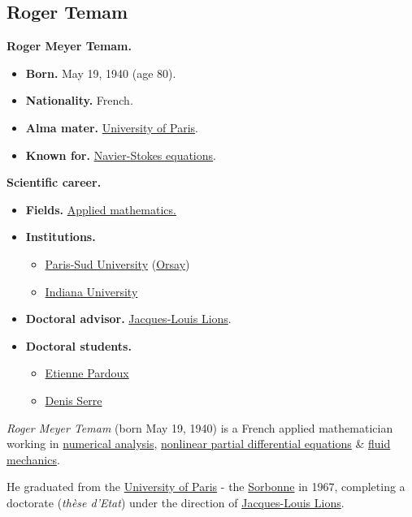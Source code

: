 \documentclass{article}
\begin{document}
\subsection{Roger Temam}
\textbf{Roger Meyer Temam.}
\begin{itemize}
	\item \textbf{Born.} May 19, 1940 (age 80).
	\item \textbf{Nationality.} French.
	\item \textbf{Alma mater.} \href{https://en.wikipedia.org/wiki/University_of_Paris}{University of Paris}.
	\item \textbf{Known for.} \href{https://en.wikipedia.org/wiki/Navier-Stokes_equations}{Navier-Stokes equations}.
\end{itemize}
\textbf{Scientific career.}
\begin{itemize}
	\item \textbf{Fields.} \href{https://en.wikipedia.org/wiki/Applied_mathematics}{Applied mathematics.}
	\item \textbf{Institutions.}
	\begin{itemize}
		\item \href{https://en.wikipedia.org/wiki/Paris-Sud_University}{Paris-Sud University} (\href{https://en.wikipedia.org/wiki/Orsay}{Orsay})
		\item \href{https://en.wikipedia.org/wiki/Indiana_University_Bloomington}{Indiana University}
	\end{itemize}
	\item \textbf{Doctoral advisor.} \href{https://en.wikipedia.org/wiki/Jacques-Louis_Lions}{Jacques-Louis Lions}.
	\item \textbf{Doctoral students.}
	\begin{itemize}
		\item \href{https://en.wikipedia.org/wiki/Etienne_Pardoux}{Etienne Pardoux}
		\item \href{https://en.wikipedia.org/wiki/Denis_Serre}{Denis Serre}
	\end{itemize}
\end{itemize}
\textit{Roger Meyer Temam} (born May 19, 1940) is a French applied mathematician working in \href{https://en.wikipedia.org/wiki/Numerical_analysis}{numerical analysis}, \href{https://en.wikipedia.org/wiki/Nonlinear_partial_differential_equations}{nonlinear partial differential equations} \& \href{https://en.wikipedia.org/wiki/Fluid_mechanics}{fluid mechanics}.

He graduated from the \href{https://en.wikipedia.org/wiki/University_of_Paris}{University of Paris} - the \href{https://en.wikipedia.org/wiki/Sorbonne}{Sorbonne} in 1967, completing a doctorate (\textit{thèse d'Etat}) under the direction of \href{https://en.wikipedia.org/wiki/Jacques-Louis_Lions}{Jacques-Louis Lions}.
\end{document}
